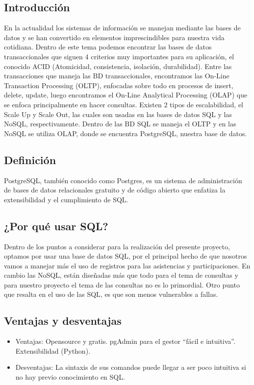 \documentclass{article}
\begin{document}
\subsection{Introducción}
En la actualidad los sistemas de información se manejan mediante las bases de
datos y se han convertido en elementos imprescindibles para nuestra vida
cotidiana. Dentro de este tema podemos encontrar las bases de datos
transaccionales que siguen 4 criterios muy importantes para su aplicación, el
conocido ACID (Atomicidad, consistencia, isolación, durabilidad). Entre las
transacciones que maneja las BD transaccionales, encontramos las On-Line
Transaction Processing (OLTP), enfocadas sobre todo en procesos de insert,
delete, update, luego encontramos el On-Line Analytical Processing (OLAP) que se
enfoca principalmente en hacer consultas. Existen 2 tipos de escalabilidad, el
Scale Up y Scale Out, las cuales son usadas en las bases de datos SQL y las
NoSQL, respectivamente. Dentro de las BD SQL se maneja el OLTP y en las NoSQL se
utiliza OLAP, donde se encuentra PostgreSQL, nuestra base de datos.

\subsection{Definición}
PostgreSQL, también conocido como Postgres, es un sistema de administración de
bases de datos relacionales gratuito y de código abierto que enfatiza la
extensibilidad y el cumplimiento de SQL.

\subsection{¿Por qué usar SQL?}
Dentro de los puntos a considerar para la realización del presente proyecto,
optamos por usar una base de datos SQL, por el principal hecho de que nosotros
vamos a manejar más el uso de registros para las asistencias y participaciones.
En cambio las NoSQL, están diseñadas más que todo para el tema de consultas y
para nuestro proyecto el tema de las consultas no es lo primordial. Otro punto
que resalta en el uso de las SQL, es que son menos vulnerables a fallas.

\subsection{Ventajas y desventajas}
\begin{itemize}
    \item Ventajas: Opensource y gratis. pgAdmin para el gestor ``fácil e intuitiva''.
        Extensibilidad (Python).
    \item Desventajas: La sintaxis de sus comandos puede llegar a
        ser poco intuitiva si no hay previo conocimiento en SQL.
\end{itemize}
\end{document}
